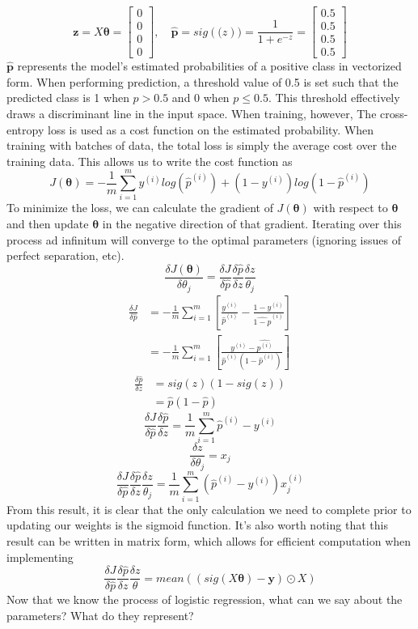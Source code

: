 \documentclass[11pt,largemargins]{homework}
\begin{document}
$$\mathbf{z}=X\mathbf{\theta}=
\begin{bmatrix}
	0\\
	0\\
	0\\
	0
\end{bmatrix},\quad\mathbf{\hat{p}}=sig(\mathbf(z))= \frac{1}{1+e^{-z}}=
\begin{bmatrix}
	0.5\\
	0.5\\
	0.5\\
	0.5
\end{bmatrix}$$
$\mathbf{\hat{p}}$ represents the model's estimated probabilities of a positive class in vectorized form. When performing prediction, a threshold value of 0.5 is set such that the predicted class is 1 when $p>0.5$ and 0 when $p\leq 0.5$. This threshold effectively draws a discriminant line in the input space. When training, however, The cross-entropy loss is used as a cost function on the estimated probability. When training with batches of data, the total loss is simply the average cost over the training data. This allows us to write the cost function as
$$J(\mathbf{\theta})=-\frac{1}{m}\sum_{i=1}^my^{(i)}log(\hat{p}^{(i)})+(1-y^{(i)})log(1-\hat{p}^{(i)})$$
To minimize the loss, we can calculate the gradient of $J(\mathbf{\theta})$ with respect to $\mathbf{\theta}$ and then update $\mathbf{\theta}$ in the negative direction of that gradient. Iterating over this process ad infinitum will converge to the optimal parameters (ignoring issues of perfect separation, etc).
$$\frac{\delta J(\mathbf{\theta})}{\delta \theta_j}=\frac{\delta J}{\delta \hat{p}}\frac{\delta \hat{p}}{\delta z}\frac{\delta z}{\theta_j}$$
\begin{align*}
	\frac{\delta J}{\delta\hat{p}} &= -\frac{1}{m}\sum_{i=1}^m\left[\frac{y^{(i)}}{\hat{p}^{(i)}}-\frac{1-y^{(i)}}{\hat{1-p}^{(i)}}\right]\\
	&= -\frac{1}{m}\sum_{i=1}^m\left[ \frac{y^{(i)}-\hat{p^{(i)}}}{\hat{p}^{(i)}(1-\hat{p}^{(i)})}\right]
\end{align*}
\begin{align*}
	\frac{\delta\hat{p}}{\delta z}&= sig(z)(1-sig(z))\\
	&= \hat{p}(1-\hat{p})
\end{align*}
$$\frac{\delta J}{\delta\hat{p}}\frac{\delta\hat{p}}{\delta z}=\frac{1}{m}\sum_{i=1}^m\hat{p}^{(i)}-y^{(i)}$$
$$\frac{\delta z}{\delta\theta_j}=x_j$$
$$\frac{\delta J}{\delta \hat{p}}\frac{\delta \hat{p}}{\delta z}\frac{\delta z}{\theta_j}=\frac{1}{m}\sum_{i=1}^m(\hat{p}^{(i)}-y^{(i)})x_j^{(i)}$$  
From this result, it is clear that the only calculation we need to complete prior to updating our weights is the sigmoid function.
It's also worth noting that this result can be written in matrix form, which allows for efficient computation when implementing
$$\frac{\delta J}{\delta \hat{p}}\frac{\delta \hat{p}}{\delta z}\frac{\delta z}{\theta}=mean((sig(X\mathbf{\theta})-\mathbf{y})\odot X)$$
Now that we know the process of logistic regression, what can we say about the parameters? What do they represent?
\end{document}

